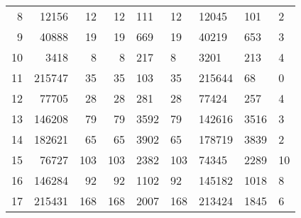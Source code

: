 \begin{table}[]
{\begin{tabular}{r|rrrl|llll}
8  & 12156                       & 12                       & 12    & 111                       & 12                                   & 12045                              & 101                                 & 2                                   \\
9  & 40888                       & 19                       & 19    & 669                       & 19                                   & 40219                              & 653                                 & 3                                   \\
10 & 3418                        & 8                        & 8     & 217                       & 8                                    & 3201                               & 213                                 & 4                                   \\
11 & 215747                      & 35                       & 35    & 103                       & 35                                   & 215644                             & 68                                  & 0                                   \\
12 & 77705                       & 28                       & 28    & 281                       & 28                                   & 77424                              & 257                                 & 4                                   \\
13 & 146208                      & 79                       & 79    & 3592                      & 79                                   & 142616                             & 3516                                & 3                                   \\
14 & 182621                      & 65                       & 65    & 3902                      & 65                                   & 178719                             & 3839                                & 2                                   \\ \hline
15 & 76727                       & 103                      & 103   & 2382                      & 103                                  & 74345                              & 2289                                & 10                                  \\
16 & 146284                      & 92                       & 92    & 1102                      & 92                                   & 145182                             & 1018                                & 8                                   \\
17 & 215431                      & 168                      & 168   & 2007                      & 168                                  & 213424                             & 1845                                & 6                                   \\ \hline
\end{tabular}
}
\vspace{-0.4cm}
\end{table}